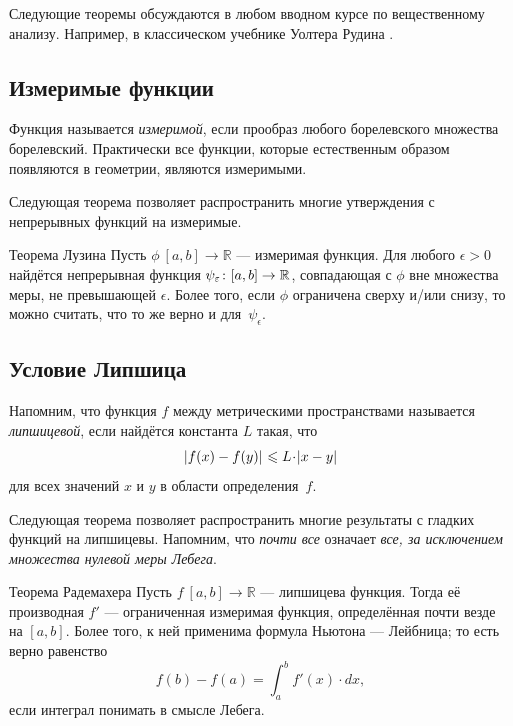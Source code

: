 {Следующие теоремы обсуждаются в любом вводном курсе по вещественному анализу.
Например, в классическом учебнике Уолтера Рудина \cite{rudin}.


\subsection*{Измеримые функции}

Функция называется \emph{измеримой}, если прообраз любого борелевского множества борелевский.
Практически все функции, которые естественным образом появляются в геометрии, являются измеримыми.

Следующая теорема позволяет распространить многие утверждения с непрерывных функций на измеримые.

\begin{thm}{Теорема Лузина}\label{thm:lusin}
Пусть $\phi\:[a,b]\to \mathbb{R}$ --- измеримая функция.
Для любого $\epsilon>0$ найдётся непрерывная функция $\psi_\epsilon\:[a,b]\z\to \mathbb{R}$, совпадающая с $\phi$ вне множества меры, не превышающей $\epsilon$.
Более того, если $\phi$ ограничена сверху и/или снизу, то можно считать, что то же верно и для~$\psi_\epsilon$.  
\end{thm}

\subsection*{Условие Липшица}

Напомним, что функция $f$ между метрическими пространствами называется \emph{липшицевой}, если найдётся константа $L$ такая, что 
\[\dist{f(x)}{f(y)}{}\le L\cdot\dist{x}{y}{}\]
для всех значений $x$ и $y$ в области определения~$f$.

Следующая теорема позволяет распространить многие результаты с гладких функций на липшицевы.
Напомним, что {}\emph{почти все} означает \textit{все, за исключением множества нулевой меры Лебега}.

\begin{thm}{Теорема Радемахера}\label{thm:rademacher}
Пусть $f\:[a,b]\to\mathbb{R}$ --- липшицева функция.
Тогда её производная $f'$ --- ограниченная измеримая функция, определённая почти везде на $[a,b]$.
Более того, к ней применима формула Ньютона --- Лейбница; то есть верно равенство
\[f(b)-f(a)=\int_a^b f'(x)\cdot dx,\]
если интеграл понимать в смысле Лебега.
\end{thm}


}

